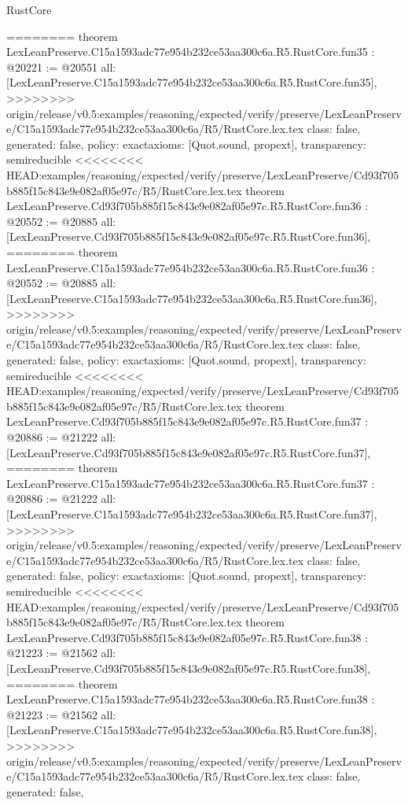 \begin{lexlean}{RustCore}
\begin{coremodule}
{\begin{coremodule}
{{{{{{{{{{{{{{{{{{{{{{{{{{{{{{{{{{{{{{========
theorem LexLeanPreserve.C15a1593adc77e954b232ce53aa300c6a.R5.RustCore.fun35 : @20221 := @20551 {
  all: [LexLeanPreserve.C15a1593adc77e954b232ce53aa300c6a.R5.RustCore.fun35],
>>>>>>>> origin/release/v0.5:examples/reasoning/expected/verify/preserve/LexLeanPreserve/C15a1593adc77e954b232ce53aa300c6a/R5/RustCore.lex.tex
  class: false,
  generated: false,
  policy: exact{axioms: [Quot.sound, propext]},
  transparency: semireducible
}
<<<<<<<< HEAD:examples/reasoning/expected/verify/preserve/LexLeanPreserve/Cd93f705b885f15c843e9e082af05e97c/R5/RustCore.lex.tex
theorem LexLeanPreserve.Cd93f705b885f15c843e9e082af05e97c.R5.RustCore.fun36 : @20552 := @20885 {
  all: [LexLeanPreserve.Cd93f705b885f15c843e9e082af05e97c.R5.RustCore.fun36],
========
theorem LexLeanPreserve.C15a1593adc77e954b232ce53aa300c6a.R5.RustCore.fun36 : @20552 := @20885 {
  all: [LexLeanPreserve.C15a1593adc77e954b232ce53aa300c6a.R5.RustCore.fun36],
>>>>>>>> origin/release/v0.5:examples/reasoning/expected/verify/preserve/LexLeanPreserve/C15a1593adc77e954b232ce53aa300c6a/R5/RustCore.lex.tex
  class: false,
  generated: false,
  policy: exact{axioms: [Quot.sound, propext]},
  transparency: semireducible
}
<<<<<<<< HEAD:examples/reasoning/expected/verify/preserve/LexLeanPreserve/Cd93f705b885f15c843e9e082af05e97c/R5/RustCore.lex.tex
theorem LexLeanPreserve.Cd93f705b885f15c843e9e082af05e97c.R5.RustCore.fun37 : @20886 := @21222 {
  all: [LexLeanPreserve.Cd93f705b885f15c843e9e082af05e97c.R5.RustCore.fun37],
========
theorem LexLeanPreserve.C15a1593adc77e954b232ce53aa300c6a.R5.RustCore.fun37 : @20886 := @21222 {
  all: [LexLeanPreserve.C15a1593adc77e954b232ce53aa300c6a.R5.RustCore.fun37],
>>>>>>>> origin/release/v0.5:examples/reasoning/expected/verify/preserve/LexLeanPreserve/C15a1593adc77e954b232ce53aa300c6a/R5/RustCore.lex.tex
  class: false,
  generated: false,
  policy: exact{axioms: [Quot.sound, propext]},
  transparency: semireducible
}
<<<<<<<< HEAD:examples/reasoning/expected/verify/preserve/LexLeanPreserve/Cd93f705b885f15c843e9e082af05e97c/R5/RustCore.lex.tex
theorem LexLeanPreserve.Cd93f705b885f15c843e9e082af05e97c.R5.RustCore.fun38 : @21223 := @21562 {
  all: [LexLeanPreserve.Cd93f705b885f15c843e9e082af05e97c.R5.RustCore.fun38],
========
theorem LexLeanPreserve.C15a1593adc77e954b232ce53aa300c6a.R5.RustCore.fun38 : @21223 := @21562 {
  all: [LexLeanPreserve.C15a1593adc77e954b232ce53aa300c6a.R5.RustCore.fun38],
>>>>>>>> origin/release/v0.5:examples/reasoning/expected/verify/preserve/LexLeanPreserve/C15a1593adc77e954b232ce53aa300c6a/R5/RustCore.lex.tex
  class: false,
  generated: false,
}}}}}}}}}}}}}}}}}}}}}}}}}}}}}}}}}}}}}}}}}}
\end{coremodule}}
\end{coremodule}
\end{lexlean}
